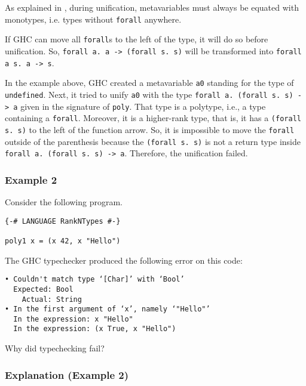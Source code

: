 As explained in \cite{jones-practical-2007}, during unification, metavariables must always be equated with monotypes, i.e. types without \texttt{forall} anywhere.

If GHC can move all \texttt{forall}s to the left of the type, it will do so before unification.
So, \texttt{forall a. a -> (forall s. s)} will be transformed into \texttt{forall a s. a -> s}.

In the example above, GHC created a metavariable \texttt{a0} standing for the type of \texttt{undefined}.
Next, it tried to unify \texttt{a0} with the type \texttt{forall a. (forall s. s) -> a} given in the signature of \texttt{poly}.
That type is a polytype, i.e., a type containing a \texttt{forall}.
Moreover, it is a higher-rank type, that is, it has a \texttt{(forall s. s)} to the left of the function arrow.
So, it is impossible to move the \texttt{forall} outside of the parenthesis because the \texttt{(forall s. s)} is not a return type inside \texttt{forall a. (forall s. s) -> a}.
Therefore, the unification failed.

\subsubsection{Example 2}

Consider the following program.

\begin{verbatim}
{-# LANGUAGE RankNTypes #-}

poly1 x = (x 42, x "Hello")
\end{verbatim}

The GHC typechecker produced the following error on this code:

\begin{verbatim}
• Couldn't match type ‘[Char]’ with ‘Bool’
  Expected: Bool
    Actual: String
• In the first argument of ‘x’, namely ‘"Hello"’
  In the expression: x "Hello"
  In the expression: (x True, x "Hello")
\end{verbatim}

Why did typechecking fail?

\subsubsection{Explanation (Example 2)}

